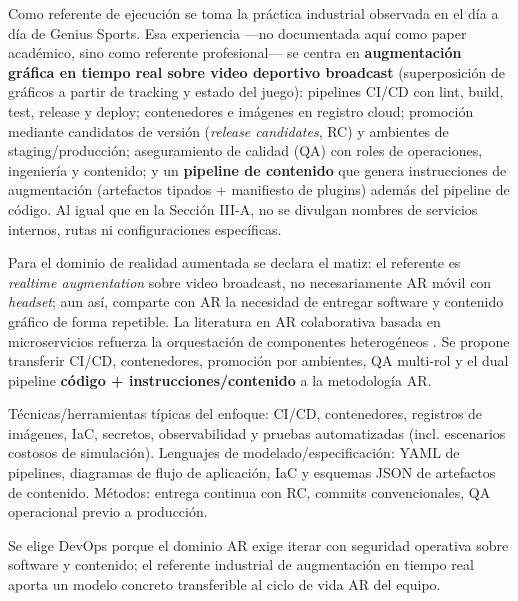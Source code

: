 \documentclass[conference]{IEEEtran}
\begin{document}
Como referente de ejecución se toma la práctica industrial observada en el día a día de Genius Sports. Esa experiencia —no documentada aquí como paper académico, sino como referente profesional— se centra en \textbf{augmentación gráfica en tiempo real sobre video deportivo broadcast} (superposición de gráficos a partir de tracking y estado del juego): pipelines CI/CD con lint, build, test, release y deploy; contenedores e imágenes en registro cloud; promoción mediante candidatos de versión (\textit{release candidates}, RC) y ambientes de staging/producción; aseguramiento de calidad (QA) con roles de operaciones, ingeniería y contenido; y un \textbf{pipeline de contenido} que genera instrucciones de augmentación (artefactos tipados + manifiesto de plugins) además del pipeline de código. Al igual que en la Sección III-A, no se divulgan nombres de servicios internos, rutas ni configuraciones específicas.

Para el dominio de realidad aumentada se declara el matiz: el referente es \textit{realtime augmentation} sobre video broadcast, no necesariamente AR móvil con \textit{headset}; aun así, comparte con AR la necesidad de entregar software y contenido gráfico de forma repetible. La literatura en AR colaborativa basada en microservicios refuerza la orquestación de componentes heterogéneos \cite{Vaquero2020}. Se propone transferir CI/CD, contenedores, promoción por ambientes, QA multi-rol y el dual pipeline \textbf{código + instrucciones/contenido} a la metodología AR.

Técnicas/herramientas típicas del enfoque: CI/CD, contenedores, registros de imágenes, IaC, secretos, observabilidad y pruebas automatizadas (incl. escenarios costosos de simulación). Lenguajes de modelado/especificación: YAML de pipelines, diagramas de flujo de aplicación, IaC y esquemas JSON de artefactos de contenido. Métodos: entrega continua con RC, commits convencionales, QA operacional previo a producción.

Se elige DevOps porque el dominio AR exige iterar con seguridad operativa sobre software y contenido; el referente industrial de augmentación en tiempo real aporta un modelo concreto transferible al ciclo de vida AR del equipo.
\end{document}
